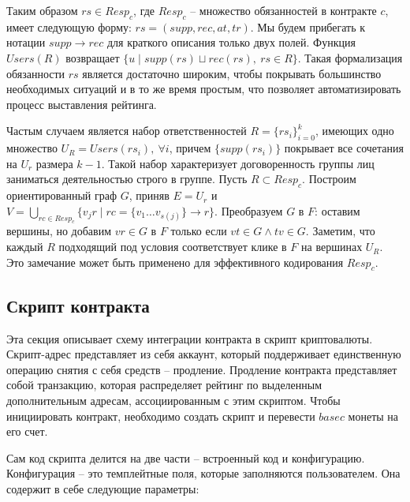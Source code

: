 \documentclass[specification,annotation]{itmo-student-thesis}
\begin{document}
Таким образом $rs \in Resp_c$, где $Resp_c$ -- множество обязанностей
в контракте $c$, имеет следующую форму: $rs = (supp, rec, at, tr)$. Мы
будем прибегать к нотации $supp \rightarrow rec$ для краткого описания
только двух полей. Функция $Users(R)$ возвращает $\{ u \mid supp(rs)
\sqcup rec(rs), \ rs \in R \}$. Такая формализация обязанности $rs$
является достаточно широким, чтобы покрывать большинство необходимых
ситуаций и в то же время простым, что позволяет автоматизировать
процесс выставления рейтинга.

Частым случаем является набор ответственностей $R = \{rs_i\}_{i=0}^k$,
имеющих одно множество $U_R = Users(rs_i), \ \forall i $, причем
$\{supp(rs_i)\}$ покрывает все сочетания на $U_r$ размера $k-1$. Такой
набор характеризует договоренность группы лиц заниматься деятельностью
строго в группе. Пусть $R \subset Resp_c$. Построим ориентированный
граф $G$, приняв $E = U_r$ и $V = \bigcup_{rc \in Resp_c}{\{v_jr \mid
  rc = \{v_1\ldots v_{s(j)}\} \rightarrow r\}}$. Преобразуем $G$ в
$F$: оставим вершины, но добавим $vr \in G$ в $F$ только если $vt \in
G \wedge tv \in G$. Заметим, что каждый $R$ подходящий под условия
соответствует клике в $F$ на вершинах $U_R$. Это замечание может быть
применено для эффективного кодирования $Resp_c$.

\subsection{Скрипт контракта}

Эта секция описывает схему интеграции контракта в скрипт
криптовалюты. Скрипт-адрес представляет из себя аккаунт, который
поддерживает единственную операцию снятия с себя средств --
продление. Продление контракта представляет собой транзакцию, которая
распределяет рейтинг по выделенным дополнительным адресам,
ассоциированным с этим скриптом. Чтобы инициировать контракт,
необходимо создать скрипт и перевести $basec$ монеты на его счет.

Сам код скрипта делится на две части -- встроенный код и
конфигурацию. Конфигурация -- это темплейтные поля, которые
заполняются пользователем. Она содержит в себе следующие параметры:
\end{document}
